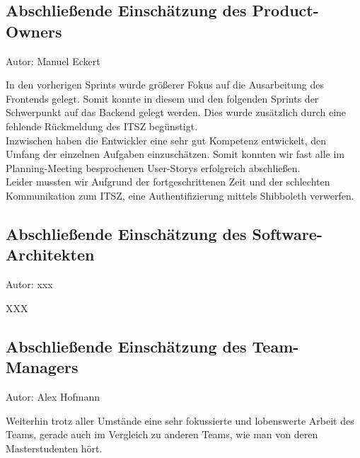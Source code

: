 \subsection{Abschließende Einschätzung des Product-Owners}
{\small Autor: Manuel Eckert}

In den vorherigen Sprints wurde größerer Fokus auf die Ausarbeitung des Frontends gelegt. Somit konnte in diesem und den folgenden Sprints der Schwerpunkt auf das Backend gelegt werden. Dies wurde zusätzlich durch eine fehlende Rückmeldung des ITSZ begünstigt. \\
Inzwischen haben die Entwickler eine sehr gut Kompetenz entwickelt, den Umfang der einzelnen Aufgaben einzuschätzen. Somit konnten wir fast alle im Planning-Meeting besprochenen User-Storys erfolgreich abschließen. \\
Leider mussten wir Aufgrund der fortgeschrittenen Zeit und der schlechten Kommunikation zum ITSZ, eine Authentifizierung mittels Shibboleth verwerfen.   

\subsection{Abschließende Einschätzung des Software-Architekten}
{\small Autor: xxx}

XXX

\subsection{Abschließende Einschätzung des Team-Managers}
{\small Autor: Alex Hofmann}

Weiterhin trotz aller Umstände eine sehr fokussierte und lobenswerte Arbeit des Teams, gerade auch im Vergleich zu anderen Teams, wie man von deren Masterstudenten hört.

